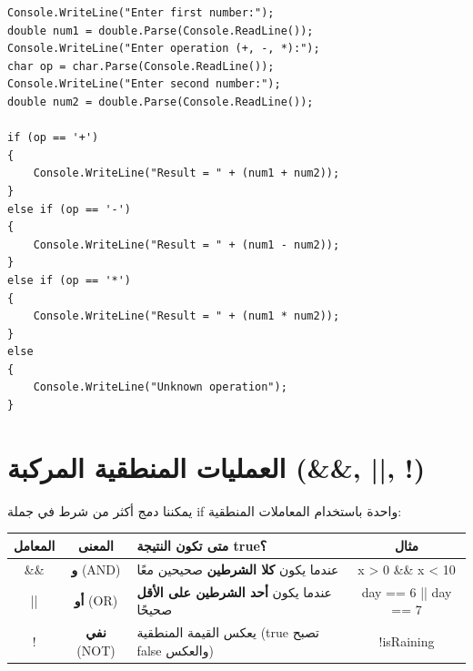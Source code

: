 \documentclass[14pt]{extarticle}
\begin{document}
\begin{boxExample}
\begin{english}
\begin{verbatim}
Console.WriteLine("Enter first number:");
double num1 = double.Parse(Console.ReadLine());
Console.WriteLine("Enter operation (+, -, *):");
char op = char.Parse(Console.ReadLine());
Console.WriteLine("Enter second number:");
double num2 = double.Parse(Console.ReadLine());

if (op == '+')
{
    Console.WriteLine("Result = " + (num1 + num2));
}
else if (op == '-')
{
    Console.WriteLine("Result = " + (num1 - num2));
}
else if (op == '*')
{
    Console.WriteLine("Result = " + (num1 * num2));
}
else
{
    Console.WriteLine("Unknown operation");
}
\end{verbatim}
\end{english}
\end{boxExample}

\clearpage
\section{العمليات المنطقية المركبة (\textenglish{\&\&}, \textenglish{||}, \textenglish{!})}

يمكننا دمج أكثر من شرط في جملة \textenglish{if} واحدة باستخدام المعاملات المنطقية:

\begin{center}
\begin{tabular}{|c|c|C{5.8cm}|c|}
\hline
\textbf{المعامل} & \textbf{المعنى} & \textbf{متى تكون النتيجة \textenglish{true}؟} & \textbf{مثال} \\
\hline
\textenglish{\&\&} & \textbf{و} (\textenglish{AND}) & عندما يكون \textbf{كلا الشرطين} صحيحين معًا & \textenglish{x > 0 \&\& x < 10} \\
\hline
\textenglish{||} & \textbf{أو} (\textenglish{OR}) & عندما يكون \textbf{أحد الشرطين على الأقل} صحيحًا & \textenglish{day == 6 || day == 7} \\
\hline
\textenglish{!} & \textbf{نفي} (\textenglish{NOT}) & يعكس القيمة المنطقية (\textenglish{true} تصبح \textenglish{false} والعكس) & \textenglish{!isRaining} \\
\hline
\end{tabular}
\end{center}
\end{document}
